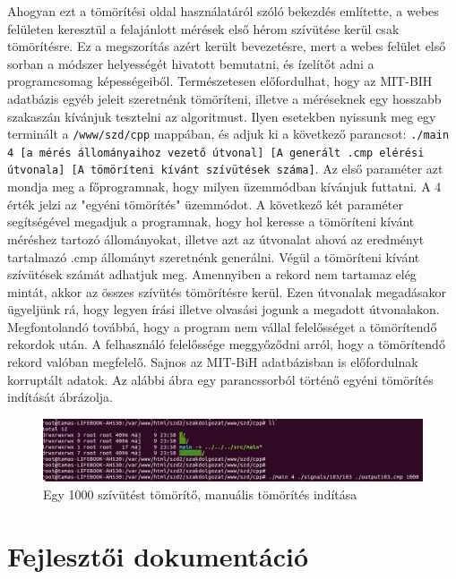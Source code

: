 \documentclass[oneside,titlepage,12pt,a4paper]{report}
\begin{document}
Ahogyan ezt a tömörítési oldal használatáról szóló bekezdés említette, a webes felületen keresztül a felajánlott mérések első hérom szívütése kerül csak tömörítésre. Ez a megszorítás azért került bevezetésre, mert a webes felület első sorban a módszer helyességét hivatott bemutatni, és ízelítőt adni a programcsomag képességeiből. Természetesen előfordulhat, hogy az MIT-BIH adatbázis egyéb jeleit szeretnénk tömöríteni, illetve a méréseknek egy hosszabb szakaszán kívánjuk tesztelni az algoritmust. Ilyen esetekben nyissunk meg egy terminált a \texttt{/www/szd/cpp}  mappában, és adjuk ki a következő parancsot: \texttt{./main 4 [a mérés állományaihoz vezető útvonal] [A generált .cmp elérési útvonala] [A tömöríteni kívánt szívütések száma]}. Az első paraméter azt mondja meg a főprogramnak, hogy milyen üzemmódban kívánjuk futtatni. A 4 érték jelzi az "egyéni tömörítés" üzemmódot. A következő két paraméter segítségével megadjuk a programnak, hogy hol keresse a tömöríteni kívánt méréshez  tartozó állományokat, illetve azt az útvonalat ahová az eredményt tartalmazó .cmp állományt szeretnénk generálni. Végül a tömöríteni kívánt szívütések számát adhatjuk meg. Amennyiben a rekord nem tartamaz elég mintát, akkor az összes szívütés tömörítésre kerül. Ezen útvonalak megadásakor ügyeljünk rá, hogy legyen írási illetve olvasási jogunk a megadott útvonalakon. Megfontolandó továbbá, hogy a program nem vállal felelősséget a tömörítendő rekordok után. A felhasználó felelőssége meggyőződni arról, hogy a tömörítendő rekord valóban megfelelő. Sajnos az MIT-BiH adatbázisban is előfordulnak korruptált adatok. Az alábbi ábra egy parancssorból történő egyéni tömörítés indítását ábrázolja.

\begin{figure}[H]
\begin{center}
   \includegraphics[width=150mm]{./Abrak/WWW/manualis_tom.jpg}
  \caption{Egy 1000 szívütést tömörítő, manuális tömörítés indítása}
\end{center}
\end{figure}

\chapter{Fejlesztői dokumentáció}
\end{document}
